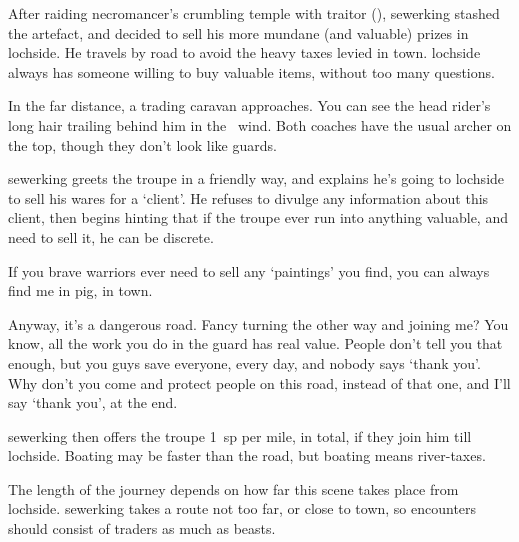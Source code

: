 \begin{exampletext}
  After raiding \gls{necromancer}'s crumbling temple with \gls{traitor} (), \gls{sewerking} stashed the \gls{artefact}, and decided to sell his more mundane (and valuable) prizes in \gls{lochside}.
  He travels by road to avoid the heavy taxes levied in \gls{town}.
  \Gls{lochside} always has someone willing to buy valuable items, without too many questions.
\end{exampletext}

\begin{boxtext}
  In the far distance, a trading caravan approaches.
  You can see the head rider's long hair trailing behind him in the \showTemperature\ wind.
  Both coaches have the usual archer on the top, though they don't look like \glspl{guard}.
\end{boxtext}

\Gls{sewerking} greets the troupe in a friendly way, and explains he's going to \gls{lochside} to sell his wares for a `client'.
He refuses to divulge any information about this client, then begins hinting that if the troupe ever run into anything valuable, and need to sell it, he can be discrete.

\setcounter{wounds}{2}

\sewerking




\null
\begin{speechtext}
  If you brave warriors ever need to sell any `paintings' you find, you can always find me in \gls{pig}, in \gls{town}.

  Anyway, it's a dangerous road.
  Fancy turning the other way and joining me?
  You know, all the work you do in the \gls{guard} has real value.
  People don't tell you that enough, but you guys save everyone, every day, and nobody says `thank you'.
  Why don't you come and protect people on this road, instead of that one, and I'll say `thank you', at the end.
\end{speechtext}

\Gls{sewerking} then offers the troupe 1~\gls{sp} per mile, in total, if they join him till \gls{lochside}.
Boating may be faster than the road, but boating means river-taxes.

The length of the journey depends on how far this scene takes place from \gls{lochside}.
\Gls{sewerking} takes a route not too far, or close to town, so encounters should consist of traders as much as beasts.

